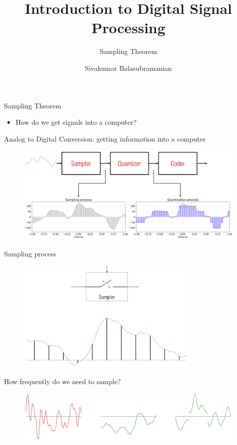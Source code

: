 \documentclass[aspectratio=169]{beamer}
\title{Introduction to Digital Signal Processing}
\subtitle{Sampling Theorem}
\author{Sivakumar Balasubramanian}
\institute[Christian Medical College] %
{
  \inst{}%
  Department of Bioengineering\\
  Christian Medical College, Bagayam\\
  Vellore 632002
}
\date{}
\let\olditem\item
\renewcommand{\item}{\setlength{\itemsep}{\fill}\olditem}
\begin{document}
\begin{frame}
  \titlepage
\end{frame}


\begin{frame}[t]{Sampling Theorem}
\begin{itemize}
  \item How do we get signals into a computer?
\end{itemize}
\end{frame}


\begin{frame}[t]{Analog to Digital Conversion: getting information into a computer}
\begin{figure}
\includegraphics[width=\textwidth]{img/adproc.png}
\end{figure}
\end{frame}


\begin{frame}[t]{Sampling process}
\begin{figure}
\includegraphics[width=0.8\textwidth, left]{img/sampler.png}
\end{figure}
\end{frame}


\begin{frame}{How frequently do we need to sample?}
\begin{figure}
\includegraphics[width=\textwidth, left]{img/samp2.png}
\end{figure}
\end{frame}
\end{document}
